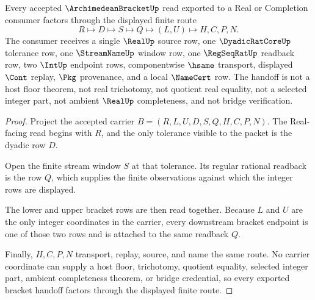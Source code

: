 \begin{theorem}
\label{thm:archimedean-bracket-real-window-handoff}
Every accepted $\ArchimedeanBracketUp$ read exported to a Real or Completion consumer factors through the displayed finite route
$$
R \longmapsto D \longmapsto S \longmapsto Q \longmapsto (L,U) \longmapsto H,C,P,N .
$$
The consumer receives a single $\RealUp$ source row, one $\DyadicRatCoreUp$ tolerance row, one $\StreamNameUp$ window row, one $\RegSeqRatUp$ readback row, two $\IntUp$ endpoint rows, componentwise $\hsame$ transport, displayed $\Cont$ replay, $\Pkg$ provenance, and a local $\NameCert$ row. The handoff is not a host floor theorem, not real trichotomy, not quotient real equality, not a selected integer part, not ambient $\RealUp$ completeness, and not bridge verification.
\end{theorem}
\begin{proof}
Project the accepted carrier $B=(R,L,U,D,S,Q,H,C,P,N)$. The Real-facing read begins with $R$, and the only tolerance visible to the packet is the dyadic row $D$.

Open the finite stream window $S$ at that tolerance. Its regular rational readback is the row $Q$, which supplies the finite observations against which the integer rows are displayed.

The lower and upper bracket rows are then read together. Because $L$ and $U$ are the only integer coordinates in the carrier, every downstream bracket endpoint is one of those two rows and is attached to the same readback $Q$.

Finally, $H,C,P,N$ transport, replay, source, and name the same route. No carrier coordinate can supply a host floor, trichotomy, quotient equality, selected integer part, ambient completeness theorem, or bridge credential, so every exported bracket handoff factors through the displayed finite route.
\end{proof}



